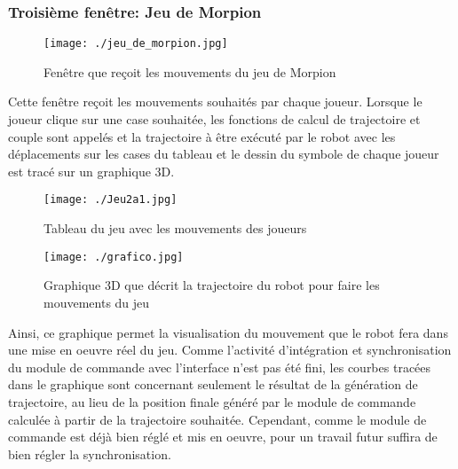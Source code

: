 \subsubsection{Troisième fenêtre: Jeu de Morpion}\label{Fen3}

\begin{figure}[H]
	\begin{center}	
		\captionsetup{justification=centering,margin=1cm}
		\texttt{[image: ./jeu\_de\_morpion.jpg]}
		\caption{Fenêtre que reçoit les mouvements du jeu de Morpion}
		\label{fig:Fen3}
	\end{center}
\end{figure}

Cette fenêtre reçoit les mouvements souhaités par chaque joueur. Lorsque le joueur clique sur une case souhaitée, les fonctions de calcul de trajectoire et couple sont appelés et la trajectoire à être exécuté par le robot avec les déplacements sur les  cases du tableau et le dessin du symbole de chaque joueur est tracé sur un graphique 3D.

\begin{figure}[H]
	\begin{center}	
		\captionsetup{justification=centering,margin=1cm}
		\texttt{[image: ./Jeu2a1.jpg]}
		\caption{Tableau du jeu avec les mouvements des joueurs}
		\label{fig:Jeu}
	\end{center}
\end{figure}

\begin{figure}[H]
	\begin{center}
		\captionsetup{justification=centering,margin=1cm}	
		\texttt{[image: ./grafico.jpg]}
		\caption{Graphique 3D que décrit la trajectoire du robot pour faire les mouvements du jeu}
		\label{fig:graphique}
	\end{center}
\end{figure}

Ainsi, ce graphique permet la visualisation du mouvement que le robot fera dans une mise en oeuvre réel du jeu. Comme l’activité d'intégration et synchronisation du module de commande avec l’interface n’est pas été fini, les courbes tracées dans le graphique sont concernant seulement le résultat de la génération de trajectoire, au lieu de la position finale généré par le module de commande calculée à partir de la trajectoire souhaitée. Cependant, comme le module de commande est déjà bien réglé et mis en oeuvre, pour un travail futur suffira de bien régler la synchronisation. 

